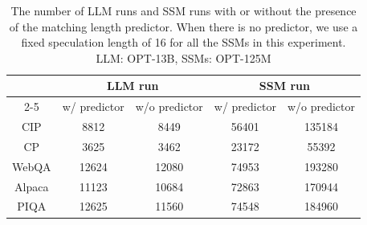 

\begin{table}
\caption{The number of LLM runs and SSM runs with or without the presence of the matching length predictor. When there is no predictor, we use a fixed speculation length of 16 for all the SSMs in this experiment. LLM: OPT-13B, SSMs: OPT-125M}
\label{tab:lss-opt}
\begin{center}
\begin{tabular}{ccccc}
\toprule
       & \multicolumn{2}{c}{LLM run} & \multicolumn{2}{c}{SSM run} \\ \cmidrule{2-5} 
       & w/ predictor    & w/o predictor   & w/ predictor    & w/o predictor   \\ \midrule
CIP    & 8812         & 8449         & 56401        & 135184       \\
CP     & 3625         & 3462         & 23172        & 55392        \\
WebQA  & 12624        & 12080        & 74953        & 193280       \\
 Alpaca & 11123        & 10684        & 72863        & 170944       \\
PIQA   & 12625        & 11560        & 74548        & 184960       \\ \bottomrule
\end{tabular}
\end{center}
\end{table}
